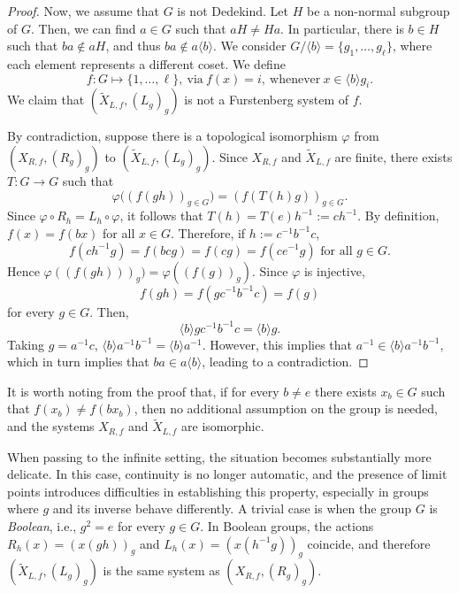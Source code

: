 \documentclass{amsart}
\numberwithin{equation}{section}
\theoremstyle{definition}
\theoremstyle{plain}
\begin{document}
\begin{proof}
Now, we assume that $G$ is not Dedekind. Let $H$ be a 
non-normal subgroup of $G$. Then, we can find $a\in G$ such that $aH\neq Ha$. In particular, there is $b\in H$ such that $ba\notin aH$, and thus $ba\notin a\langle b\rangle $. We consider $G/\langle b \rangle=\{g_1,\dots,g_{\ell}\}$, where each element represents a different coset. We define $$f:G \mapsto \{1,\dots,\ell\},\ \text{via}\ f(x)=i, \ \text{whenever}\ x\in \langle b\rangle g_i.$$ We claim that $(\widetilde{X}_{L,f},(L_g)_g)$ is not a Furstenberg system of $f$.

     By contradiction, suppose there is a topological isomorphism $\varphi$ from $(X_{R,f},(R_g)_g)$ to $(\widetilde{X}_{L,f},(L_g)_g)$. Since $X_{R,f}$ and $\widetilde{X}_{L,f}$ are  finite, there exists $T:G\to G$ such that 
    $$\varphi\Big( (f(gh))_{g\in G}\Big)=(f(T(h)g))_{g\in G}.$$
    Since $\varphi \circ R_h=L_h\circ\varphi$, it follows that $T(h)=T(e)h^{-1}:=ch^{-1}.$
   By definition, $f(x)=f(bx)$ for all $x\in G$. Therefore, if $h:=c^{-1}b^{-1}c$, $$f(ch^{-1}g)=f(bcg)=f(cg)=f(ce^{-1}g) \text{ for all $g\in G.$}$$ Hence $\varphi((f(gh)))_g)=\varphi((f(g))_g).$
   Since $\varphi$ is injective, $$f(gh)=f(gc^{-1}b^{-1}c)=f(g)$$ for every $g\in G$. Then, $$\langle b \rangle g c^{-1}b^{-1}c=\langle b\rangle g.$$ 
   Taking $g=a^{-1}c$, $\langle b\rangle a^{-1}b^{-1}=\langle b\rangle a^{-1}$. However, this implies that $a^{-1}\in \langle b \rangle a^{-1}b^{-1}$, which in turn implies that $ba \in a\langle b\rangle$, leading to a contradiction. 
    \end{proof}
It is worth noting from the proof that, if for every $b \neq e$ there exists $x_b \in G$ such that $f(x_b) \neq f(bx_b)$, then no additional assumption on the group is needed, and the systems $X_{R,f}$ and $\widetilde{X}_{L,f}$ are isomorphic.

When passing to the infinite setting, the situation becomes substantially more delicate. In this case, continuity is no longer automatic, and the presence of limit points introduces difficulties in establishing this property, especially in groups where $g$ and its inverse behave differently. A trivial case is when the group $G$ is \emph{Boolean}, i.e., $g^2 = e$ for every $g \in G$. In Boolean groups, the actions $R_h(x) = (x(gh))_g$ and $L_h(x) = (x(h^{-1}g))_g$ coincide, and therefore $(\widetilde{X}_{L,f}, (L_g)_g)$ is the same system as $(X_{R,f}, (R_g)_g)$.
\end{document}
